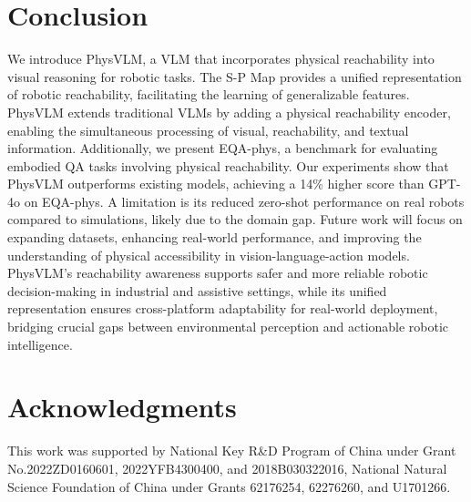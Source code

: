 \documentclass[10pt,twocolumn,letterpaper]{article}
\begin{document}
\section{Conclusion}
We introduce PhysVLM, a VLM that incorporates physical reachability into visual reasoning for robotic tasks. The S-P Map provides a unified representation of robotic reachability, facilitating the learning of generalizable features. PhysVLM extends traditional VLMs by adding a physical reachability encoder, enabling the simultaneous processing of visual, reachability, and textual information. Additionally, we present EQA-phys, a benchmark for evaluating embodied QA tasks involving physical reachability. Our experiments show that PhysVLM outperforms existing models, achieving a 14\% higher score than GPT-4o on EQA-phys. A limitation is its reduced zero-shot performance on real robots compared to simulations, likely due to the domain gap. Future work will focus on expanding datasets, enhancing real-world performance, and improving the understanding of physical accessibility in vision-language-action models. PhysVLM's reachability awareness supports safer and more reliable robotic decision-making in industrial and assistive settings, while its unified representation ensures cross-platform adaptability for real-world deployment, bridging crucial gaps between environmental perception and actionable robotic intelligence.




\section{Acknowledgments}
This work was supported by National Key R\&D Program of China under Grant No.2022ZD0160601, 2022YFB4300400, and 2018B030322016, National Natural Science Foundation of China under Grants 62176254, 62276260, and U1701266.


{
    \small
    
    
}

% 
\end{document}

